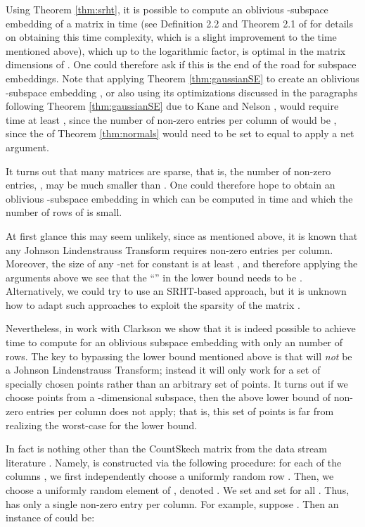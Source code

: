 \documentclass[11pt]{article}
\begin{document}
Using Theorem \ref{thm:srht}, it is possible to compute an oblivious -subspace embedding of a matrix 
in  time (see Definition 2.2 and Theorem 2.1 of \cite{AL08} for details on obtaining
this time complexity, which is a slight improvement to the  time mentioned above), which up to the logarithmic factor, is optimal in the matrix dimensions
of . One could therefore ask if this is the end of the road for subspace embeddings. 
Note that applying Theorem \ref{thm:gaussianSE} to create an oblivious -subspace embedding , 
or also using its optimizations discussed in the paragraphs following Theorem \ref{thm:gaussianSE} due to
Kane and Nelson \cite{kn14}, would
require time at least , since the number of non-zero entries per column of 
would be , 
since the  of Theorem \ref{thm:normals} would need to be set
to equal  to apply a net argument. 

It turns out that many matrices  are sparse, 
that is, the number of non-zero entries, , may be much smaller than . One could therefore
hope to obtain an oblivious -subspace embedding  in which  can be computed 
in 
time and which the number of rows of  is small. 

At first glance this may seem unlikely, since as mentioned
above, it is known that any Johnson Lindenstrauss Transform requires 
  non-zero entries per column. Moreover, the size of any -net
for constant  is at least , and therefore applying the arguments above we see that the ``'' in 
the lower bound needs to be . Alternatively, we could try to use an SRHT-based approach, but 
it is unknown how to adapt such approaches to exploit the sparsity of the matrix . 

Nevertheless, in work with Clarkson \cite{CW13} we show that it is indeed possible to achieve  time to
compute  for an oblivious   
subspace embedding  with only an 
number of rows. The key to bypassing the lower bound mentioned above is that  will {\it not} be a Johnson
Lindenstrauss Transform; instead it will only work for a set of  specially chosen points rather
than an arbitrary set of  points. It turns out if we choose  points from a -dimensional subspace,
then the above lower bound of  non-zero entries per column
does not apply; that is, this set of  points is far from realizing the worst-case for the lower bound. 

In fact  is nothing other than the {\sf CountSkech} matrix from the data stream literature 
\cite{ccf04,tz12}.
Namely,  is constructed via the following procedure: for each of the  columns , 
we first independently choose a 
uniformly random row
. Then, we choose a uniformly random element of , denoted . We set  and set  for all . 
Thus,  has only a single non-zero entry per column. For example, suppose . Then an instance of  could
be:
\end{document}

